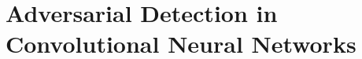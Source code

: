 
\graphicspath{{img/adversarial/}}

\chapter{Adversarial Detection in Convolutional Neural Networks}
\label{ch:adversarial}

